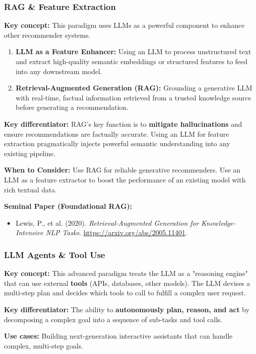 \documentclass{article}
\begin{document}
    \subsubsection{RAG \& Feature Extraction}
\noindent\textbf{Key concept:} This paradigm uses LLMs as a powerful component to enhance other recommender systems.
    \begin{enumerate}
        \item \textbf{LLM as a Feature Enhancer:} Using an LLM to process unstructured text and extract high-quality semantic embeddings or structured features to feed into any downstream model.
        \item \textbf{Retrieval-Augmented Generation (RAG):} Grounding a generative LLM with real-time, factual information retrieved from a trusted knowledge source before generating a recommendation.
    \end{enumerate}
\noindent\textbf{Key differentiator:} RAG's key function is to \textbf{mitigate hallucinations} and ensure recommendations are factually accurate. Using an LLM for feature extraction pragmatically injects powerful semantic understanding into any existing pipeline.

\noindent\textbf{When to Consider:} Use RAG for reliable generative recommenders. Use an LLM as a feature extractor to boost the performance of an existing model with rich textual data.

\noindent\textbf{Seminal Paper (Foundational RAG):}
    \begin{itemize}
        \item Lewis, P., et al. (2020). \textit{Retrieval-Augmented Generation for Knowledge-Intensive NLP Tasks}. \url{https://arxiv.org/abs/2005.11401}.
    \end{itemize}

    \subsubsection{LLM Agents \& Tool Use}
\noindent\textbf{Key concept:} This advanced paradigm treats the LLM as a "reasoning engine" that can use external \textbf{tools} (APIs, databases, other models). The LLM devises a multi-step plan and decides which tools to call to fulfill a complex user request.

\noindent\textbf{Key differentiator:} The ability to \textbf{autonomously plan, reason, and act} by decomposing a complex goal into a sequence of sub-tasks and tool calls.

\noindent\textbf{Use cases:} Building next-generation interactive assistants that can handle complex, multi-step goals.
\end{document}
